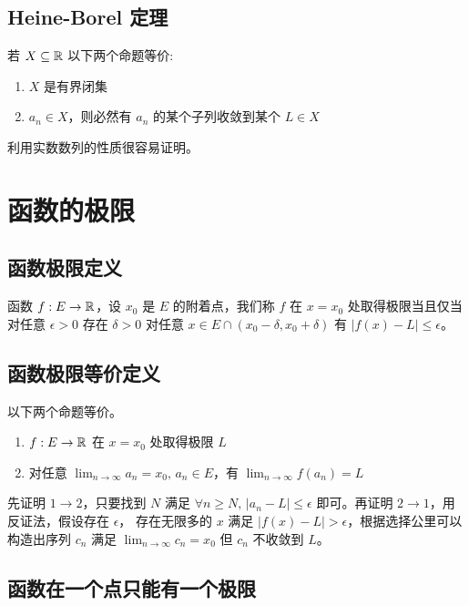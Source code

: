 \subsection{Heine-Borel 定理}

若 $X \subseteq \mathbb{R}$ 以下两个命题等价:

\begin{enumerate}
    \item $X$ 是有界闭集
    \item $a_n \in X$，则必然有 $a_n$ 的某个子列收敛到某个 $L \in X$ 
\end{enumerate}

利用实数数列的性质很容易证明。

\section{函数的极限}

\subsection{函数极限定义}

函数 $f: E \to \mathbb{R}$，设 $x_0$ 是 $E$ 的附着点，我们称 $f$ 在 $x=x_0$ 处取得极限当且仅当 对任意 $\epsilon > 0$ 存在 $\delta > 0$ 
对任意 $x \in E \cap (x_0 - \delta, x_0 + \delta)$ 有 $\lvert f(x) - L \rvert \le \epsilon $。

\subsection{函数极限等价定义}

以下两个命题等价。

\begin{enumerate}
    \item $f: E \to \mathbb{R}$ 在 $x = x_0$ 处取得极限 $L$
    \item 对任意 $\lim_{n \to \infty} a_n = x_0,\, a_n \in E$，有 $\lim_{n \to \infty} f(a_n) = L$
\end{enumerate}

先证明 $1 \to 2$，只要找到 $N$ 满足 $\forall n \ge N,\, \lvert a_n - L\rvert \le \epsilon$ 即可。再证明 $2 \to 1$，用反证法，假设存在 $\epsilon$，
存在无限多的 $x$ 满足 $\lvert f(x) - L\rvert > \epsilon $，根据选择公里可以构造出序列 $c_n$ 满足 $\lim_{n \to \infty} c_n = x_0$ 但 $c_n$ 不收敛到 $L$。

\subsection{函数在一个点只能有一个极限}

